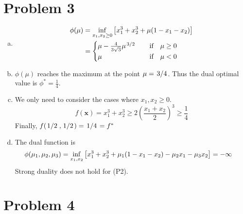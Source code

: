 \documentclass{article}
\def\bx{\boldsymbol{x}}
\begin{document}
\section*{Problem 3}
\begin{enumerate}[(a)]
    \item
		\[
		    \begin{aligned}
				\phi(\mu)
				&=
				\inf_{x_1,x_2\ge0}
				\qty[x_1^3+x_2^3+\mu(1-x_1-x_2)]
				\\&=
				\begin{cases}
				    \mu
					-\frac{4}{3\sqrt{3}}\mu^{\flatfrac{3}{2}}
					&\qif\mu\ge0
					\\
					\mu&\qif\mu<0
				\end{cases}
		    \end{aligned}
		\]
    \item
		$\phi(\mu)$ reaches the maximum at the point $\mu=\flatfrac{3}{4}$. Thus the dual optimal value is $\phi^*=\frac{1}{4}$.
	\item
		We only need to consider the cases where $x_1,x_2\ge 0$.
		\[
			f(\bx)=x_1^3+x_2^3
			\ge
			2(\frac{x_1+x_2}{2})^3
			\ge \frac{1}{4}
		\]
		Finally, $f(\flatfrac{1}{2},\flatfrac{1}{2})=\flatfrac{1}{4}=f^*$
	\item
		The dual function is
		\[
		    \begin{aligned}
		        \phi(\mu_1,\mu_2,\mu_3)
				&=
				\inf_{x_1,x_2}\qty[
					x_1^3+x_2^3+\mu_1(1-x_1-x_2)
					-\mu_2x_1-\mu_3x_2
				]
				=-\infty
		    \end{aligned}
		\]
		Strong duality does not hold for (P2).
\end{enumerate}

\section*{Problem 4}
\end{document}
